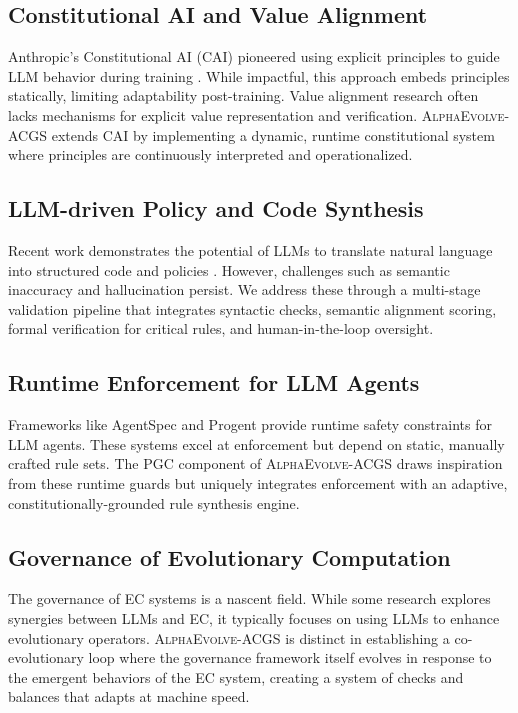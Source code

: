 \documentclass[10pt,twocolumn]{article}
\newcommand{\acgs}{\textsc{AlphaEvolve-ACGS}}
\theoremstyle{definition}
\begin{document}
\subsection{Constitutional AI and Value Alignment}
Anthropic's Constitutional AI (CAI) pioneered using explicit principles to guide LLM behavior during training \cite{anthropic2022constitutional}. While impactful, this approach embeds principles statically, limiting adaptability post-training. Value alignment research \cite{russell2019human} often lacks mechanisms for explicit value representation and verification. \acgs{} extends CAI by implementing a dynamic, runtime constitutional system where principles are continuously interpreted and operationalized.

\subsection{LLM-driven Policy and Code Synthesis}
Recent work demonstrates the potential of LLMs to translate natural language into structured code and policies \cite{propertygpt2023, veriplan2023}. However, challenges such as semantic inaccuracy and hallucination persist. We address these through a multi-stage validation pipeline that integrates syntactic checks, semantic alignment scoring, formal verification for critical rules, and human-in-the-loop oversight.

\subsection{Runtime Enforcement for LLM Agents}
Frameworks like AgentSpec \cite{agentspec2023} and Progent \cite{progent2023} provide runtime safety constraints for LLM agents. These systems excel at enforcement but depend on static, manually crafted rule sets. The PGC component of \acgs{} draws inspiration from these runtime guards but uniquely integrates enforcement with an adaptive, constitutionally-grounded rule synthesis engine.

\subsection{Governance of Evolutionary Computation}
The governance of EC systems is a nascent field. While some research explores synergies between LLMs and EC, it typically focuses on using LLMs to enhance evolutionary operators. \acgs{} is distinct in establishing a co-evolutionary loop where the governance framework itself evolves in response to the emergent behaviors of the EC system, creating a system of checks and balances that adapts at machine speed.
\end{document}
